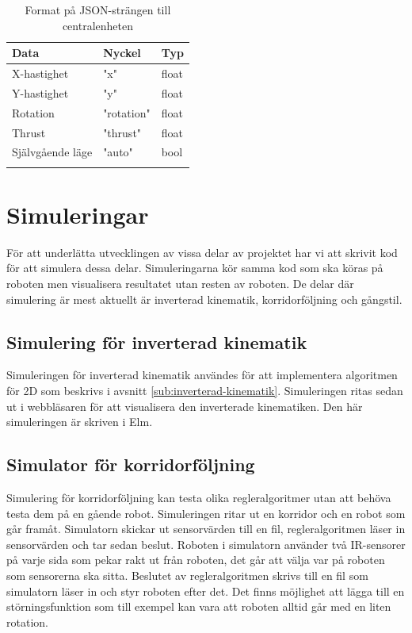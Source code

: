 \documentclass[a4paper,titlepage,12pt]{article}
\begin{document}
	\begin{longtable}[c]{l l l }
        \textbf{Data} & \textbf{Nyckel} & \textbf{Typ} \\ \midrule
        X-hastighet & "x" & float \\
        Y-hastighet & "y" & float \\
        Rotation & "rotation" & float \\
        Thrust & "thrust" & float \\
        Självgående läge & "auto" & bool \\

		\caption{Format på JSON-strängen till
        centralenheten\label{table:guimessagestocentral}}
	\end{longtable}
    

    \newpage
	\section{Simuleringar}
	För att underlätta utvecklingen av vissa delar av projektet har vi att
    skrivit kod för att simulera dessa delar. Simuleringarna kör samma kod som
    ska köras på roboten men visualisera resultatet utan resten av roboten. De
    delar där simulering är mest aktuellt är inverterad kinematik,
    korridorföljning och gångstil.

	\subsection{Simulering för inverterad kinematik}
	Simuleringen för inverterad kinematik användes för att implementera algoritmen för 2D som 
	beskrivs i avsnitt \ref{sub:inverterad-kinematik}. Simuleringen ritas sedan ut i
    webbläsaren för att visualisera den inverterade kinematiken. Den här
    simuleringen är skriven i Elm.
	
	\subsection{Simulator för korridorföljning}
	Simulering för korridorföljning kan testa olika regleralgoritmer utan att
    behöva testa dem på en gående robot. Simuleringen ritar ut en korridor och
    en robot som går framåt. Simulatorn skickar ut sensorvärden till en fil,
    regleralgoritmen läser in sensorvärden och tar sedan beslut. Roboten i
    simulatorn använder två IR-sensorer på varje sida som pekar rakt ut från
    roboten, det går att välja var på roboten som sensorerna ska sitta. Beslutet
    av regleralgoritmen skrivs till en fil som simulatorn läser in och styr
    roboten efter det. Det finns möjlighet att lägga till en störningsfunktion
    som till exempel kan vara att roboten alltid går med en liten rotation.
	
\end{document}

